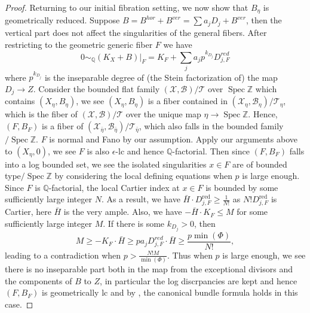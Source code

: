 \documentclass[letterpaper,reqno,12pt]{amsart}
\DeclareMathOperator{\Spec}{Spec}
\numberwithin{equation}{section}
\theoremstyle{plain}
\begin{document}
\begin{proof}
    Returning to our initial fibration setting, we now show that $B_{\eta}$ is geometrically reduced. Suppose $B=B^{hor}+B^{ver}=\sum a_jD_j+B^{ver}$, then the vertical part does not affect the singularities of the general fibers. After restricting to the geometric generic fiber $F$ we have \[0\sim_{\mathbb Q} (K_X+B)|_F=K_F+\sum_ja_{j}p^{k_{D_j}}D_{j,F}^{red}\] where $p^{k_{D_j}}$ is the inseparable degree of (the Stein factorization of) the map $D_j\to Z$. Consider  the bounded flat family $(\mathcal X,\mathcal B)/\mathcal T$ over $\Spec \mathbb Z$ which contains $(X_\eta,B_\eta)$, we see $(X_\eta,B_\eta)$ is a fiber contained in $(\mathcal X_\eta,\mathcal B_\eta)/\mathcal T_\eta$, which is the fiber of $(\mathcal X,\mathcal B)/\mathcal T$ over the unique map $\eta\to\Spec \mathbb Z$. Hence, $(F,B_F)$ is a fiber of $(\mathcal X_{\bar\eta},\mathcal B_{\bar\eta})/\mathcal T_{\bar\eta}$, which also falls in the bounded family$/\Spec \mathbb Z$. $F$ is normal and Fano by our assumption. Apply our arguments above to $(X_\eta, 0)$, we see $F$ is also $\epsilon$-lc and hence $\mathbb Q$-factorial. Then since $(F,B_F)$ falls into a log bounded set, we see the isolated singularities $x\in F$ are of bounded type$/\Spec\mathbb Z$ by considering the local defining equations when $p$ is large enough. Since $F$ is $\mathbb Q$-factorial, the local Cartier index at $x\in F$ is bounded by some sufficiently large integer $N$. As a result, we have $\bar H\cdot D_{j,F}^\text{red}\geq \frac{1}{N!}$ as $N!D_{j,F}^\text{red}$ is Cartier, here $\bar H$ is the very ample. Also, we have $-\bar H\cdot K_F\leq M$ for some sufficiently large integer $M$. If there is some $k_{D_j}>0$, then \[M\geq -K_F\cdot \bar H\geq pa_jD_{j,F}^{red}\cdot\bar H\geq \frac{p\min(\Phi)}{N!},\]leading to a contradiction when $p>\frac{N!M}{\min(\Phi)}$. Thus when $p$ is large enough, we see there is no inseparable part both in the map from the exceptional divisors and the components of $B$ to $Z$, in particular the log discrpancies are kept and hence $(F,B_F)$ is geometrically lc and by \cite[0.2]{benozzocanonicalbundleformula}, the canonical bundle formula holds in this case.
\end{proof}
\end{document}
